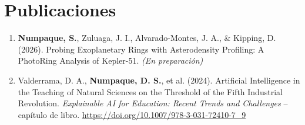 \section*{Publicaciones}
\begin{enumerate}
    \item \textbf{Numpaque, S.}, Zuluaga, J. I., Alvarado-Montes, J. A., \& Kipping, D. (2026). Probing Exoplanetary Rings with Asterodensity Profiling: A PhotoRing Analysis of Kepler-51. \textit{(En preparación)}
    \item Valderrama, D. A., \textbf{Numpaque, D. S.}, et al. (2024). Artificial Intelligence in the Teaching of Natural Sciences on the Threshold of the Fifth Industrial Revolution. \textit{Explainable AI for Education: Recent Trends and Challenges} -- capítulo de libro. \url{https://doi.org/10.1007/978-3-031-72410-7_9}
\end{enumerate}
